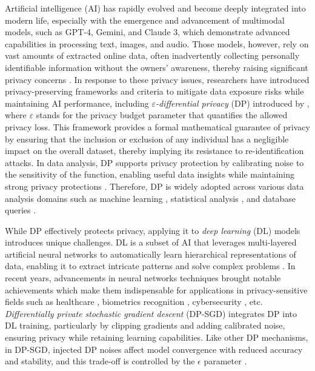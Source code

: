 Artificial intelligence (AI) has rapidly evolved and become deeply integrated into modern life, especially with the emergence and advancement of multimodal models, such as GPT-4, Gemini, and Claude 3, which demonstrate advanced capabilities in processing text, images, and audio. Those models, however, rely on vast amounts of extracted online data, often inadvertently collecting personally identifiable information without the owners’ awareness, thereby raising significant privacy concerns \citep{perrault2024artificial}. In response to these privacy issues, researchers have introduced privacy-preserving frameworks and criteria to mitigate data exposure risks while maintaining AI performance, including \textit{$\varepsilon$-differential privacy} (DP) introduced by \cite{dwork2006calibrating}, where $\varepsilon$ stands for the privacy budget parameter that quantifies the allowed privacy loss. This framework provides a formal mathematical guarantee of privacy by ensuring that the inclusion or exclusion of any individual has a negligible impact on the overall dataset, thereby implying its resistance to re-identification attacks. In data analysis, DP supports privacy protection by calibrating noise to the sensitivity of the function, enabling useful data insights while maintaining strong privacy protections \citep{dwork2006calibrating}. Therefore, DP is widely adopted across various data analysis domains such as machine learning \citep{abadi2016deep, papernot2016semi}, statistical analysis \citep{wasserman2010statistical, steinberger2024efficiency}, and database queries \citep{mcsherry2009privacy}.


While DP effectively protects privacy, applying it to \textit{deep learning} (DL) models introduces unique challenges. DL is a subset of AI that leverages multi-layered artificial neural networks to automatically learn hierarchical representations of data, enabling it to extract intricate patterns and solve complex problems \citep{noor2024survey}. In recent years, advancements in neural networks techniques brought notable achievements which make them indispensable for applications in privacy-sensitive fields such as healthcare \citep{shamshirband2021review}, biometrics recognition \citep{minaee2023biometrics}, cybersecurity \citep{dixit2021deep}, etc. \textit{Differentially private stochastic gradient descent} (DP-SGD) integrates DP into DL training, particularly by clipping gradients and adding calibrated noise, ensuring privacy while retaining learning capabilities. Like other DP mechanisms, in DP-SGD, injected DP noises affect model convergence with reduced accuracy and stability, and this trade-off is controlled by the $\epsilon$ parameter \citep{abadi2016deep}.

